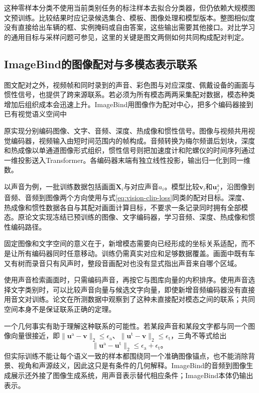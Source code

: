 这种零样本分类不使用当前类别任务的标注样本去拟合分类器，但仍依赖大规模图文预训练。比较结果时应记录候选集合、模板、图像处理和模型版本。整图相似度没有直接给出车辆的框、实例掩码或自由答案，这些输出需要其他接口。对比学习的通用目标与采样问题可参见，这里的关键是图文两侧如何共同构成配对判定。

\subsection{ImageBind的图像配对与多模态表示联系}
\label{sec:vision-models-imagebind}

图文配对之外，视频帧和同时录到的声音、彩色图与对应深度、佩戴设备的画面与惯性信号，也提供了跨来源联系。若必须为所有模态两两采集配对数据，模态种类增加后组织成本会迅速上升。ImageBind用图像作为配对中心，把多个编码器接到已有视觉语义空间中

原实现分别编码图像、文字、音频、深度、热成像和惯性信号。图像与视频共用视觉编码器，视频输入由短时间范围内的帧构成。音频转换为梅尔频谱后划块，深度和热成像以单通道图像形式组织，惯性信号则把加速度计和陀螺仪的时间序列通过一维投影送入Transformer。各编码器末端有独立线性投影，输出归一化到同一维数。

以声音为例，一批训练数据包括画面$\bm{X}_i$与对应声音$a_i$。模型比较$\bm{v}_i$和$\bm{u}^{\mathrm a}_j$，沿图像到音频、音频到图像两个方向使用与式\eqref{eq:vision-clip-loss}同类的配对目标。深度、热成像和惯性数据各自与其配对画面计算目标，不要求一条记录同时拥有全部模态。原论文实现冻结已预训练的图像、文字编码器，学习音频、深度、热成像和惯性编码路径。

固定图像和文字空间的意义在于，新增模态需要向已经形成的坐标关系适配，而不是让所有编码器同时任意移动。训练仍需真实对应和足够数据覆盖。画面中既有车又有树而录音只有风声时，整段音画配对也没有显式指出声音来自哪个区域。

使用声音检索画面时，只需编码声音，再按它与图库向量的内积排序。使用声音选择文字类别时，可以比较声音向量与候选文字向量，即使新增音频编码器没有直接用音文对训练。论文在所测数据中观察到了这种未直接配对模态之间的联系；共同空间本身不是保证联系正确的定理。

一个几何事实有助于理解这种联系的可能性。若某段声音和某段文字都与同一个图像向量很接近，即$\lVert\bm{u}^{\mathrm a}-\bm v\rVert_2\leq\epsilon_{\mathrm a}$、$\lVert\bm{u}^{\mathrm t}-\bm v\rVert_2\leq\epsilon_{\mathrm t}$，三角不等式给出
\[
  \lVert\bm{u}^{\mathrm a}-\bm{u}^{\mathrm t}\rVert_2
  \leq\epsilon_{\mathrm a}+\epsilon_{\mathrm t}\text{。}
\]
但实际训练不能让每个语义一致的样本都围绕同一个准确图像锚点，也不能消除背景、视角和声源歧义，因此这只是有条件的几何解释。ImageBind的音频到图像生成展示还外接了图像生成系统，用声音表示替代相应条件；ImageBind本体仍输出表示。

